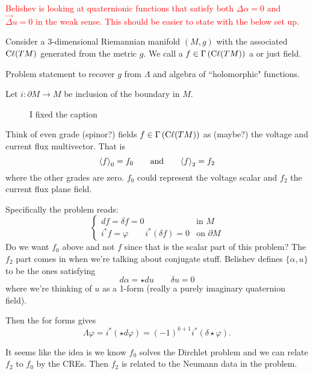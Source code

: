 \textcolor{red}{Belishev is looking at quaternionic functions that satisfy both $\Delta \alpha=0$ and $\vec{\Delta}u=0$ in the weak sense. This should be easier to state with the below set up.}

Consider a $3$-dimensional Riemannian manifold $(M,g)$ with the associated  $\mathrm{C}\ell(TM)$ generated from the metric $g$. We call a $f\in \Gamma\left(\mathrm{C}\ell(TM)\right)$ a  or just field.  

\begin{problem}
Problem statement to recover $g$ from $\Lambda$ and algebra of ``holomorphic" functions.
\end{problem}

Let $i\colon \partial M \to M$ be inclusion of the boundary in $M$.


 \begin{figure}[H]
   \centering
   \def\svgwidth{0.75\columnwidth} 
   \resizebox{75mm}{!}{}
   \caption{I fixed the caption}
   \label{fig: broken_caption_is_stupid}
 \end{figure}

Think of even grade (spinor?) fields $f\in \Gamma\left(\mathrm{C}\ell(TM)\right)$ as (maybe?) the voltage and current flux multivector. That is
\[
\projzero{f} = f_0 \qquad \textrm{and} \qquad \projtwo{f}=f_2
\]
where the other grades are zero. $f_0$ could represent the voltage scalar and $f_2$ the current flux plane field.

Specifically the problem reads:
\[
\begin{cases}
df=\delta f = 0 &\textrm{in $M$}\\
i^* f = \varphi \qquad i^*(\delta f)=0 & \textrm{on $\partial M$}
\end{cases}
\]
Do we want $f_0$ above and not $f$ since that is the scalar part of this problem? The $f_2$ part comes in when we're talking about conjugate stuff. Belishev defines  $\{\alpha,u\}$ to be the ones satisfying 
\[
d\alpha = \star d u \qquad \delta u=0
\]
where we're thinking of $u$ as a 1-form (really a purely imaginary quaternion field).

Then the  for forms gives
\[
\Lambda \varphi = i^*(\star d \varphi) = (-1)^{k+1}i^*(\delta \star \varphi).
\]

It seems like the idea is we know $f_0$ solves the Dirchlet problem and we can relate $f_2$ to $f_0$ by the CREs. Then $f_2$ is related to the Neumann data in the problem.

